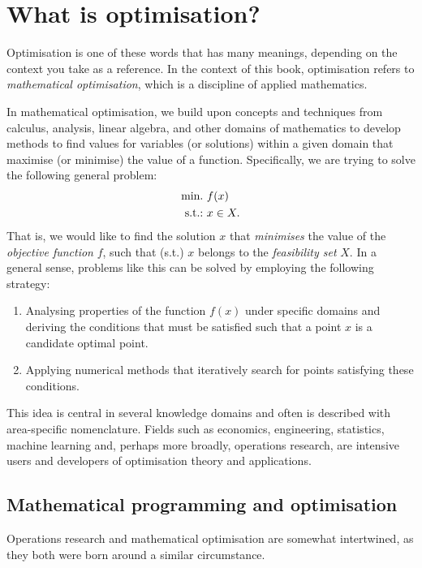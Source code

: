\section{What is optimisation?}

Optimisation is one of these words that has many meanings, depending on the context you take as a reference. In the context of this book, optimisation refers to \emph{mathematical optimisation}, which is a discipline of applied mathematics.

In mathematical optimisation, we build upon concepts and techniques from calculus, analysis, linear algebra, and other domains of mathematics to develop methods to find values for variables (or solutions) within a given domain that maximise (or minimise) the value of a function. Specifically, we are trying to solve the following general problem:
%
\begin{align}
    \mathop{\text{min.~}} & f(x) \label{p1c1:eq:opt_prob} \\
    \mathop{\text{s.t.:~}}   & x \in X. \nonumber
\end{align}
%
That is, we would like to find the solution $x$ that \emph{minimises} the value of the \emph{objective function} $f$, such that (s.t.) $x$ belongs to the \emph{feasibility set} $X$. In a general sense, problems like this can be solved by employing the following strategy:
%
\begin{enumerate}
    \item Analysing properties of the function $f(x)$ under specific domains and deriving the conditions that must be satisfied such that a point $x$ is a candidate optimal point.
    \item Applying numerical methods that iteratively search for points satisfying these conditions. 
\end{enumerate}
%
This idea is central in several knowledge domains and often is described with area-specific nomenclature. Fields such as economics, engineering, statistics, machine learning and, perhaps more broadly, operations research, are intensive users and developers of optimisation theory and applications. 

\subsection{Mathematical programming and optimisation}

Operations research and mathematical optimisation are somewhat intertwined, as they both were born around a similar circumstance. %

